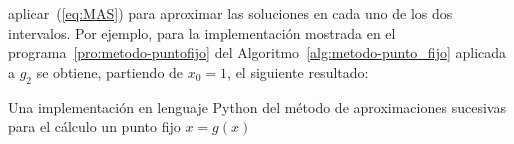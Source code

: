 \begin{example}
  aplicar~(\ref{eq:MAS}) para aproximar las soluciones en cada uno de
  los dos intervalos. Por ejemplo, para la implementación mostrada en
  el programa~\ref{pro:metodo-puntofijo} del
  Algoritmo~\ref{alg:metodo-punto_fijo} aplicada a $g_2$ se obtiene,
  partiendo de $x_0=1$, el siguiente resultado:
  \begin{pythonoutput}
  \end{pythonoutput}    
  \label{ex:punto-fijo-1}
  \begin{program}
    \label{pro:metodo-puntofijo}
    \caption{Una implementación en lenguaje Python del método de
      aproximaciones sucesivas para el cálculo un punto fijo $x=g(x)$}
  \end{program}
\end{example}




